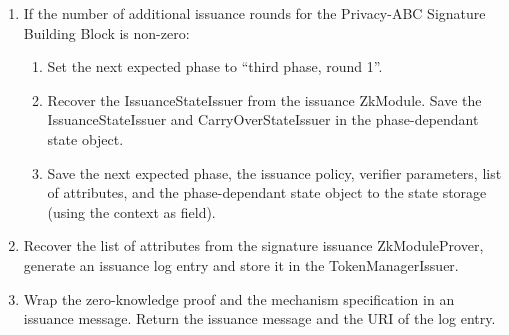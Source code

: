 \begin{enumerate}
\begin{enumerate}
      \item If the number of additional issuance rounds for the Privacy-ABC Signature Building Block is non-zero:
        \begin{enumerate}
        \item Set the next expected phase to ``third phase, round 1''.
        \item Recover the IssuanceStateIssuer from the issuance ZkModule. Save the IssuanceStateIssuer and CarryOverStateIssuer in the phase-dependant state object.
        \item Save the next expected phase, the issuance policy, verifier parameters, list of attributes,
          and the phase-dependant state object to the state storage (using the context as field).
        \end{enumerate}
      \item Recover the list of attributes from the signature issuance ZkModuleProver, generate an issuance log entry and store it in the TokenManagerIssuer.
      \item Wrap the zero-knowledge proof and the mechanism specification in an issuance message. Return the issuance message and the URI of the log entry.
      \end{enumerate}
    \end{enumerate}


